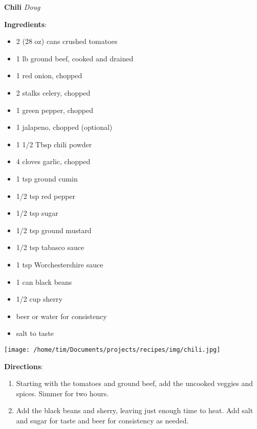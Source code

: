 \documentclass[11pt, twoside, openany]{book}
\begin{document}
\noindent\begin{minipage}[t]{\linewidth}%
{\Large\textbf{Chili}} \label{chili}\hfill\textit{Doug}\\
\noindent\begin{minipage}[t]{0.78\linewidth}%
\textbf{Ingredients}:\vspace{-3mm}
\begin{multicols}{2}
\begin{itemize}\setlength\itemsep{-1mm}
\item 2 (28 oz) cans crushed tomatoes
\item 1 lb ground beef, cooked and drained
\item 1 red onion, chopped
\item 2 stalks celery, chopped
\item 1 green pepper, chopped
\item 1 jalapeno, chopped (optional)
\item 1 1/2 Tbsp chili powder
\item 4 cloves garlic, chopped
\item 1 tsp ground cumin
\item 1/2 tsp red pepper
\item 1/2 tsp sugar
\item 1/2 tsp ground mustard
\item 1/2 tsp tabasco sauce
\item 1 tsp Worchestershire sauce
\item 1 can black beans
\item 1/2 cup sherry
\item beer or water for consistency
\item salt to taste
\end{itemize}
\end{multicols}
\end{minipage}
\noindent\begin{minipage}[t]{0.18\linewidth}
\centering \strut\vspace*{-\baselineskip}\newline
\texttt{[image: /home/tim/Documents/projects/recipes/img/chili.jpg]}\\
\end{minipage}\vspace{3mm}
\textbf{Directions}:
\vspace{-3mm}\begin{enumerate}\setlength\itemsep{-1mm}
\item Starting with the tomatoes and ground beef, add the uncooked veggies and spices. Simmer for two hours.
\item Add the black beans and sherry, leaving just enough time to heat. Add salt and sugar for taste and beer for consistency as needed.
\end{enumerate}
\end{minipage}\vspace{8mm}
\end{document}
